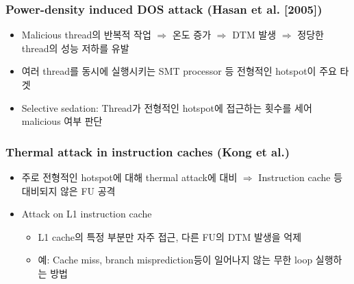 \subsubsection*{Power-density induced DOS attack (Hasan et al. [2005])}
\begin{itemize}
    \item Malicious thread의 반복적 작업 $\Rightarrow$ 온도 증가 $\Rightarrow$ DTM 발생 $\Rightarrow$ 정당한 thread의 성능 저하를 유발
    \item 여러 thread를 동시에 실행시키는 SMT processor 등 전형적인 hotspot이 주요 타겟
    \item Selective sedation: Thread가 전형적인 hotspot에 접근하는 횟수를 세어 malicious 여부 판단
\end{itemize}

\subsubsection*{Thermal attack in instruction caches (Kong et al.)}
\begin{itemize}
    \item 주로 전형적인 hotspot에 대해 thermal attack에 대비 $\Rightarrow$ Instruction cache 등 대비되지 않은 FU 공격
    \item Attack on L1 instruction cache
    \begin{itemize}
        \item L1 cache의 특정 부분만 자주 접근, 다른 FU의 DTM 발생을 억제
        \item 예: Cache miss, branch misprediction등이 일어나지 않는 무한 loop 실행하는 방법
    \end{itemize}
\end{itemize}
